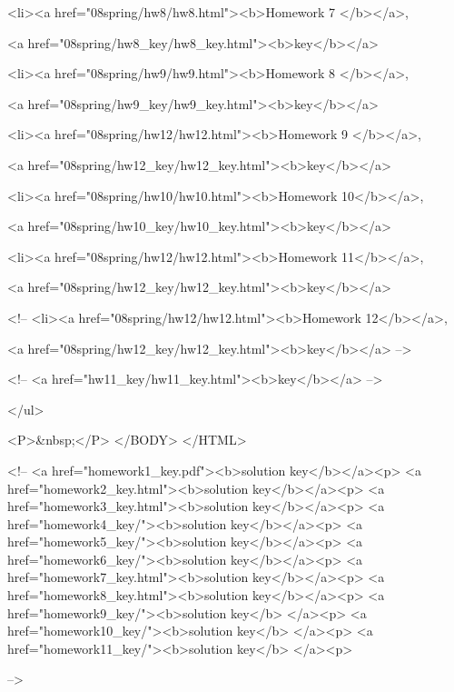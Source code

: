 <li><a href="08spring/hw8/hw8.html"><b>Homework 7 </b></a>,

    <a href="08spring/hw8_key/hw8_key.html"><b>key</b></a>

<li><a href="08spring/hw9/hw9.html"><b>Homework 8 </b></a>,

    <a href="08spring/hw9_key/hw9_key.html"><b>key</b></a>

<li><a href="08spring/hw12/hw12.html"><b>Homework 9 </b></a>,

    <a href="08spring/hw12_key/hw12_key.html"><b>key</b></a>

<li><a href="08spring/hw10/hw10.html"><b>Homework 10</b></a>,

    <a href="08spring/hw10_key/hw10_key.html"><b>key</b></a>

<li><a href="08spring/hw12/hw12.html"><b>Homework 11</b></a>,

    <a href="08spring/hw12_key/hw12_key.html"><b>key</b></a>


<!--
<li><a href="08spring/hw12/hw12.html"><b>Homework 12</b></a>,

    <a href="08spring/hw12_key/hw12_key.html"><b>key</b></a>
-->

<!--
    <a href="hw11_key/hw11_key.html"><b>key</b></a>
-->



</ul>

<P>&nbsp;</P>
</BODY>
</HTML>



<!--
<a href="homework1_key.pdf"><b>solution key</b></a><p>
<a href="homework2_key.html"><b>solution key</b></a><p>
<a href="homework3_key.html"><b>solution key</b></a><p>
<a href="homework4_key/"><b>solution key</b></a><p>
<a href="homework5_key/"><b>solution key</b></a><p>
<a href="homework6_key/"><b>solution key</b></a><p>
<a href="homework7_key.html"><b>solution key</b></a><p>
<a href="homework8_key.html"><b>solution key</b></a><p> 
<a href="homework9_key/"><b>solution key</b> </a><p>
<a href="homework10_key/"><b>solution key</b> </a><p>
<a href="homework11_key/"><b>solution key</b> </a><p>

-->
